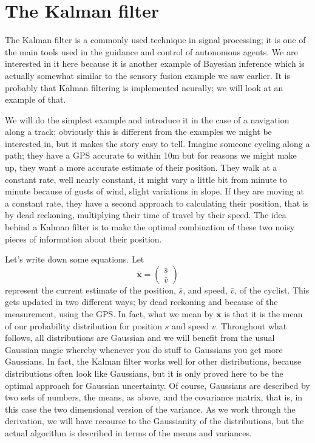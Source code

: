 \documentclass[12pt]{article}
\begin{document}
\section*{The Kalman filter}

The Kalman filter is a commonly used technique in signal processing;
it is one of the main tools used in the guidance and control of
autonomous agents. We are interested in it here because it is another
example of Bayesian inference which is actually somewhat similar to
the sensory fusion example we saw earlier. It is probably that Kalman
filtering is implemented neurally; we will look at an example of that.

We will do the simplest example and introduce it in the case of a
navigation along a track; obviously this is different from the examples we
might be interested in, but it makes the story easy to tell. Imagine
someone cycling along a path; they have a GPS accurate to within 10m
but for reasons we might make up, they want a more accurate estimate
of their position. They walk at a constant rate, well nearly
constant, it might vary a little bit from minute to minute because of
gusts of wind, slight variations in slope. If they are moving at a
constant rate, they have a second approach to calculating their
position, that is by dead reckoning, multiplying their time of travel
by their speed. The idea behind a Kalman filter is to make the optimal
combination of these two noisy pieces of information about their
position.

Let's write down some equations. Let 
\begin{equation}
\mathbf{\bar{x}}=\left(\begin{array}{c}\bar{s}\\\bar{v}\end{array}\right)
\end{equation}
represent the current estimate of the position, $\bar{s}$, and speed,
$\bar{v}$, of the cyclist. This gets updated in two different ways; by
dead reckoning and because of the measurement, using the GPS. In fact,
what we mean by $\mathbf{\bar{x}}$ is that it is the mean of our
probability distribution for position $s$ and speed $v$. Throughout
what follows, all distributions are Gaussian and we will benefit from
the usual Gaussian magic whereby whenever you do stuff to Gaussians
you get more Gaussians. In fact, the Kalman filter works well for
other distributions, because distributions often look like Gaussians,
but it is only proved here to be the optimal approach for Gaussian
uncertainty. Of course, Gaussians are described by two sets of
numbers, the means, as above, and the covariance matrix, that is, in
this case the two dimensional version of the variance. As we work
through the derivation, we will have recourse to the Gaussianity of
the distributions, but the actual algorithm is described in terms of
the means and variances.
\end{document}
